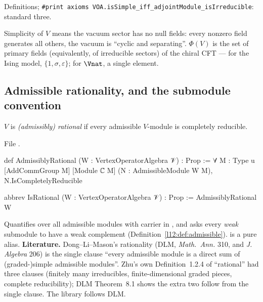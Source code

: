 \begin{status}
Definitions; \texttt{\#print axioms VOA.isSimple\_iff\_adjointModule\_isIrreducible}: standard three.
\end{status}

\begin{physics}
Simplicity of $V$ means the vacuum sector has no null fields: every nonzero field generates all others, the
vacuum is ``cyclic and separating''. $\Phi(V)$ is the set of primary fields (equivalently, of irreducible sectors) of
the chiral CFT --- for the Ising model, $\{1,\sigma,\varepsilon\}$; for $\Vnat$, a single element.
\end{physics}

\subsection{Admissible rationality, and the submodule convention}\label{l12:warn:admcr}

\begin{definition}\label{l12:def:admrat}
$V$ is \emph{(admissibly) rational} if every admissible $V$-module is completely reducible.
\end{definition}
\noindent File .
\begin{leancode}
def AdmissiblyRational (W : VertexOperatorAlgebra 𝒱) : Prop :=
  ∀ {M : Type u} [AddCommGroup M] [Module ℂ M] (N : AdmissibleModule W M),
    N.IsCompletelyReducible

abbrev IsRational (W : VertexOperatorAlgebra 𝒱) : Prop := AdmissiblyRational W
\end{leancode}

\begin{dictionary}
Quantifies over all admissible modules with carrier in , and asks every \emph{weak} submodule to have a weak
complement (Definition~\ref{l12:def:admissible}).  is a pure alias. \textbf{Literature.} Dong--Li--Mason's
rationality (DLM, \emph{Math.\ Ann.} 310, and \emph{J. Algebra} 206) is the single clause ``every admissible module is a direct
sum of (graded-)simple admissible modules''. Zhu's own Definition~1.2.4 of ``rational'' had three clauses (finitely many
irreducibles, finite-dimensional graded pieces, complete reducibility); DLM Theorem~8.1 shows the extra two follow from
the single clause. The library follows DLM.
\end{dictionary}

